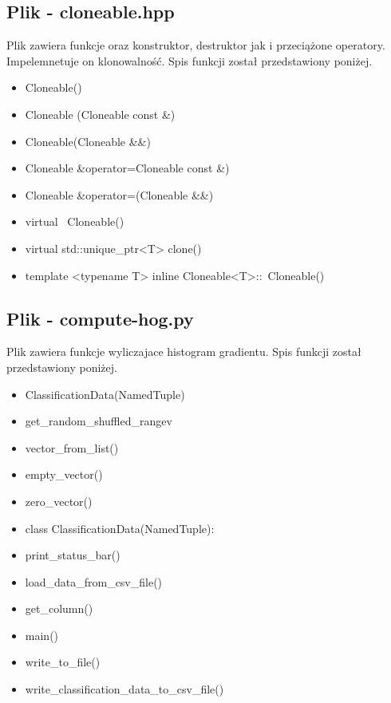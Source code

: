 \documentclass{classrep}
\begin{document}
{        \subsection{Plik - cloneable.hpp}
        {
            Plik zawiera funkcje oraz konstruktor, destruktor jak i przeciążone operatory.
            Impelemnetuje on klonowalność.
            Spis funkcji został przedstawiony poniżej.
            \begin{itemize}
                \item Cloneable()
                \item Cloneable (Cloneable const \&)
                \item Cloneable(Cloneable \&\&)
                \item Cloneable \&operator=Cloneable const \&)
                \item Cloneable \&operator=(Cloneable \&\&)
                \item virtual ~Cloneable()
                \item virtual std::unique\_ptr<T> clone()
                \item template <typename T> inline Cloneable<T>::~Cloneable()
            \end{itemize}
        }

        \subsection{Plik - compute-hog.py}
        {
            Plik zawiera funkcje wyliczajace histogram gradientu.
            Spis funkcji został przedstawiony poniżej.
            \begin{itemize}
                \item ClassificationData(NamedTuple)
                \item get\_random\_shuffled\_rangev
                \item vector\_from\_list()
                \item empty\_vector()
                \item zero\_vector()
                \item class ClassificationData(NamedTuple):
                \item print\_status\_bar()
                \item load\_data\_from\_csv\_file()
                \item get\_column()
                \item main()
                \item write\_to\_file()
                \item write\_classification\_data\_to\_csv\_file()
            \end{itemize}
        }

}
\end{document}
